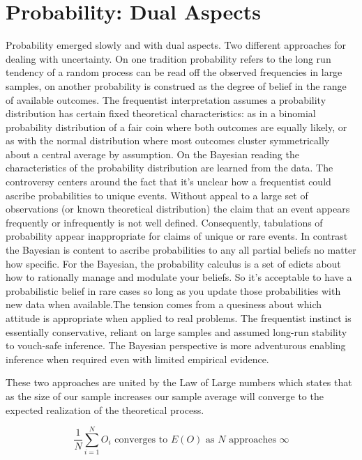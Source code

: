 \documentclass[]{tufte-book}
\theoremstyle{definition}
\theoremstyle{definition}
\theoremstyle{definition}
\theoremstyle{remark}
\begin{document}
\hypertarget{probability-dual-aspects}{%
\section{Probability: Dual Aspects}\label{probability-dual-aspects}}

Probability emerged slowly and with dual aspects. Two different approaches for dealing with uncertainty. On one tradition probability refers to the long run tendency of a random process can be read off the observed frequencies in large samples, on another probability is construed as the degree of belief in the range of available outcomes. The frequentist interpretation assumes a probability distribution has certain fixed theoretical characteristics: as in a binomial probability distribution of a fair coin where both outcomes are equally likely, or as with the normal distribution where most outcomes cluster symmetrically about a central average by assumption. On the Bayesian reading the characteristics of the probability distribution are learned from the data. The controversy centers around the fact that it's unclear how a frequentist could ascribe probabilities to unique events. Without appeal to a large set of observations (or known theoretical distribution) the claim that an event appears frequently or infrequently is not well defined. Consequently, tabulations of probability appear inappropriate for claims of unique or rare events. In contrast the Bayesian is content to ascribe probabilities to any all partial beliefs no matter how specific. For the Bayesian, the probability calculus is a set of edicts about how to rationally manage and modulate your beliefs. So it's acceptable to have a probabilistic belief in rare cases so long as you update those probabilities with new data when available.The tension comes from a quesiness about which attitude is appropriate when applied to real problems. The frequentist instinct is essentially conservative, reliant on large samples and assumed long-run stability to vouch-safe inference. The Bayesian perspective is more adventurous enabling inference when required even with limited empirical evidence.

These two approaches are united by the Law of Large numbers which states that as the size of our sample increases our sample average will converge to the expected realization of the theoretical process.

\[  \frac{1}{N} \sum_{i = 1}^{N} O_{i} \text{ converges to }  E(O) \text{ as } N \text{ approaches } \infty \]
\end{document}
